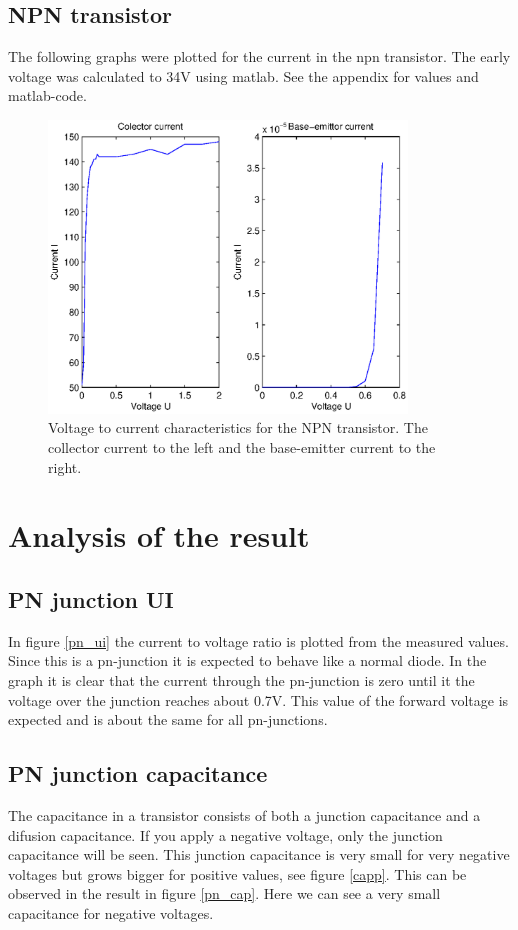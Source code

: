 \documentclass[a4paper]{article}
\begin{document}
\subsection{NPN transistor}
The following graphs were plotted for the current in the npn transistor. The early voltage was calculated to 34V using matlab. See the appendix for values and matlab-code.
\begin{figure}[H]
	\centering
	\includegraphics[width=0.85\textwidth]{npn.eps}
	\caption{Voltage to current characteristics for the NPN transistor. The collector current to the left and the base-emitter current to the right.}	
	\label{npn}
\end{figure}

\newpage
\section{Analysis of the result}
\subsection{PN junction UI}
In figure \ref{pn_ui} the current to voltage ratio is plotted from the measured values. Since this is a pn-junction it is expected to behave like a normal diode. In the graph it is clear that the current through the pn-junction is zero until it the voltage over the junction reaches about 0.7V. This value of the forward voltage is expected and is about the same for all pn-junctions.

\subsection{PN junction capacitance}
The capacitance in a transistor consists of both a junction capacitance and a difusion capacitance. If you apply a negative voltage, only the junction capacitance will be seen. This junction capacitance is very small for very negative voltages but grows bigger for positive values, see figure \ref{capp}. This can be observed in the result in figure \ref{pn_cap}. Here we can see a very small capacitance for negative voltages.
\end{document}
